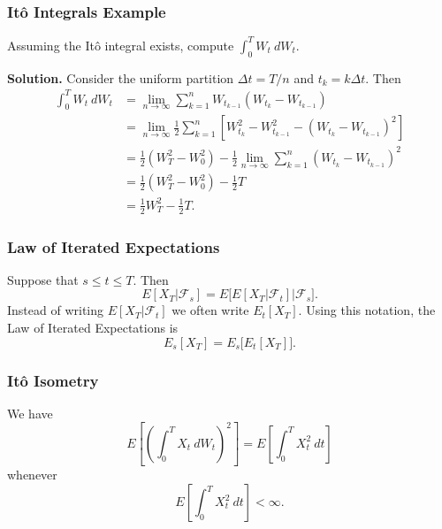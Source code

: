 \documentclass{beamer}
\begin{document}
\begin{frame}
\frametitle{It\^o Integrals Example}
\small 
\begin{Example}
Assuming the It\^o integral exists, compute $\int_0^T W_t\ dW_t$.
\end{Example}

{\bf Solution.}
Consider the uniform partition $\Delta t = T/n$ and $t_k = k \Delta t$. Then
\begin{align*}
\int_0^ T W_t\ dW_t 	&= \lim_{n\to\infty}\sum_{k = 1}^n W_{t_{k - 1}} \left(W_{t_k} - W_{t_{k - 1}}\right)\\
				&= \lim_{n\to\infty}\frac{1}{2} \sum_{k = 1}^n \left[ W_{t_k}^2 - W_{t_{k - 1}}^2 - (W_{t_k} - W_{t_{k - 1}})^2\right]\\
				&=  \frac{1}{2} (W_{T}^2 - W_0^2) - \frac{1}{2}\lim_{n\to\infty} \sum_{k = 1}^n (W_{t_k} - W_{t_{k - 1}})^2\\
				&= \frac{1}{2} (W_{T}^2 - W_0^2) - \frac{1}{2}T\\
				&= \frac{1}{2} W_{T}^2 - \frac{1}{2}T.
\end{align*}

\end{frame}

\begin{frame}
\frametitle{Law of Iterated Expectations}
Suppose that $s \leq t \leq T$. Then
$$
E[X_T |\mathcal{F}_s] = E\Big[E[X_T|\mathcal{F}_t] \Big|\mathcal{F}_s\Big].
$$
Instead of writing $E[X_T |\mathcal{F}_t]$ we often write $E_t[X_T]$. Using this notation, the Law of Iterated Expectations is
$$
E_s[X_T] = E_s\Big[E_t[X_T]\Big].
$$
\end{frame}

\begin{frame}
\frametitle{It\^o Isometry}
\begin{Theorem}[It\^o Isometry]
We have
$$
E\left[\left(\int_0^T X_t\ dW_t\right)^2\right] = E\left[\int_0^T X_t^2\ dt\right]
$$
whenever
$$
E\left[\int_0^T X_t^2\ dt\right] < \infty.
$$
\end{Theorem}
\end{frame}
\end{document}
